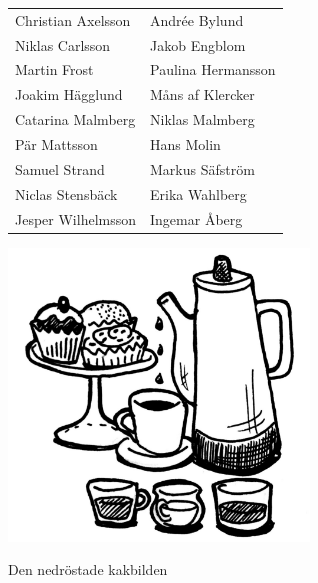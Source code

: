\documentclass[a6paper,fontsize=10pt,twoside,open=right]{scrbook}
\begin{document}
\vspace{10pt}
\par
\begin{tabular}{@{}p{}p{}@{}}
  Christian Axelsson & Andrée Bylund\\
  Niklas Carlsson & Jakob Engblom\\
  Martin Frost & Paulina Hermansson\\
  Joakim Hägglund & Måns af Klercker\\
  Catarina Malmberg & Niklas Malmberg\\
  Pär Mattsson & Hans Molin\\
  Samuel Strand & Markus Säfström\\
  Niclas Stensbäck & Erika Wahlberg\\
  Jesper Wilhelmsson & Ingemar \fontsize{9pt}{0pt}\selectfont Åberg}
\end{tabular}\par
\begin{center}
  \noindent\includegraphics[keepaspectratio,width=0.6\textwidth]{elements/punsch1.jpg}
  \par
  \noindent Den nedröstade kakbilden
\end{center}
\vfill
\end{document}
